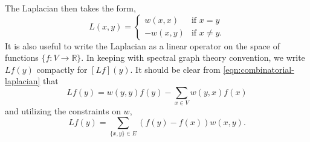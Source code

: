   The Laplacian then takes the form,
  \begin{equation}\label{eqn:combinatorial-laplacian}
    L(x,y) = 
    \begin{cases}
        w(x,x) & \text{if $x=y$} \\
        -w(x,y) & \text{if $x \neq y$}.
    \end{cases}
  \end{equation}
  It is also useful to write the Laplacian as a linear operator on the space of functions $\{f:V\rightarrow \mathbb{R}\}$. In keeping with spectral graph theory convention, we write $Lf(y)$ compactly for $[L f](y)$. It should be clear from \cref{eqn:combinatorial-laplacian} that 
  \[
    Lf(y) = w(y,y)f(y) - \sum_{x \in V} w(y,x)f(x)
  \]
  and utilizing the constraints on $w$, 
  \begin{equation}\label{eqn:operator-equation}
    Lf(y) = \sum_{\{x,y\} \in E} \left(f(y)-f(x)\right) w(x,y).
  \end{equation}

